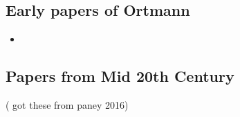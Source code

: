 \documentclass[]{book}
\providecommand{\tightlist}{%
  \setlength{\itemsep}{0pt}\setlength{\parskip}{0pt}}
\theoremstyle{definition}
\theoremstyle{definition}
\theoremstyle{definition}
\theoremstyle{remark}
\begin{document}
\hypertarget{early-papers-of-ortmann}{%
\subsection{Early papers of Ortmann}\label{early-papers-of-ortmann}}

\begin{itemize}
\tightlist
\item
  \citep{ortmannTonalDeterminantsMelodic1933}
\end{itemize}

\hypertarget{papers-from-mid-20th-century}{%
\subsection{Papers from Mid 20th
Century}\label{papers-from-mid-20th-century}}

( got these from paney 2016)
\end{document}

